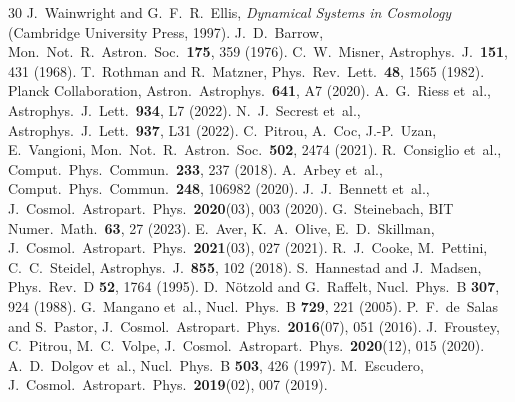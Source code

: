 \begin{thebibliography}{30}
 J.~Wainwright and G.~F.~R.~Ellis, \emph{Dynamical Systems in Cosmology} (Cambridge University Press, 1997).
 J.~D.~Barrow, Mon.\ Not.\ R.\ Astron.\ Soc.\ \textbf{175}, 359 (1976).
 C.~W.~Misner, Astrophys.\ J.\ \textbf{151}, 431 (1968).
 T.~Rothman and R.~Matzner, Phys.\ Rev.\ Lett.\ \textbf{48}, 1565 (1982).
 Planck Collaboration, Astron.\ Astrophys.\ \textbf{641}, A7 (2020).
 A.~G.~Riess et~al., Astrophys.\ J.\ Lett.\ \textbf{934}, L7 (2022).
 N.~J.~Secrest et~al., Astrophys.\ J.\ Lett.\ \textbf{937}, L31 (2022).
 C.~Pitrou, A.~Coc, J.-P.~Uzan, E.~Vangioni, Mon.\ Not.\ R.\ Astron.\ Soc.\ \textbf{502}, 2474 (2021).
 R.~Consiglio et~al., Comput.\ Phys.\ Commun.\ \textbf{233}, 237 (2018).
 A.~Arbey et~al., Comput.\ Phys.\ Commun.\ \textbf{248}, 106982 (2020).
 J.~J.~Bennett et~al., J.\ Cosmol.\ Astropart.\ Phys.\ \textbf{2020}(03), 003 (2020).
 G.~Steinebach, BIT Numer.\ Math.\ \textbf{63}, 27 (2023).
 E.~Aver, K.~A.~Olive, E.~D.~Skillman, J.\ Cosmol.\ Astropart.\ Phys.\ \textbf{2021}(03), 027 (2021).
 R.~J.~Cooke, M.~Pettini, C.~C.~Steidel, Astrophys.\ J.\ \textbf{855}, 102 (2018).
 S.~Hannestad and J.~Madsen, Phys.\ Rev.\ D \textbf{52}, 1764 (1995).
 D.~N\"otzold and G.~Raffelt, Nucl.\ Phys.\ B \textbf{307}, 924 (1988).
 G.~Mangano et~al., Nucl.\ Phys.\ B \textbf{729}, 221 (2005).
 P.~F.~de~Salas and S.~Pastor, J.\ Cosmol.\ Astropart.\ Phys.\ \textbf{2016}(07), 051 (2016).
 J.~Froustey, C.~Pitrou, M.~C.~Volpe, J.\ Cosmol.\ Astropart.\ Phys.\ \textbf{2020}(12), 015 (2020).
 A.~D.~Dolgov et~al., Nucl.\ Phys.\ B \textbf{503}, 426 (1997).
 M.~Escudero, J.\ Cosmol.\ Astropart.\ Phys.\ \textbf{2019}(02), 007 (2019).
\end{thebibliography}
